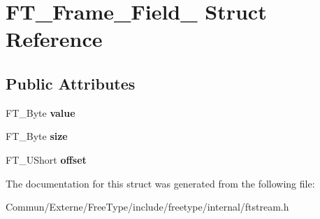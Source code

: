 \hypertarget{struct_f_t___frame___field__}{}\section{F\+T\+\_\+\+Frame\+\_\+\+Field\+\_\+ Struct Reference}
\label{struct_f_t___frame___field__}
\subsection*{Public Attributes}
\begin{DoxyCompactItemize}
\item 
F\+T\+\_\+\+Byte {\bfseries value}\hypertarget{struct_f_t___frame___field___a10f91dcdd0a582727b67ad45d42bab41}{}\label{struct_f_t___frame___field___a10f91dcdd0a582727b67ad45d42bab41}

\item 
F\+T\+\_\+\+Byte {\bfseries size}\hypertarget{struct_f_t___frame___field___a47e6fbcb90c079421d9d9b64f63a587e}{}\label{struct_f_t___frame___field___a47e6fbcb90c079421d9d9b64f63a587e}

\item 
F\+T\+\_\+\+U\+Short {\bfseries offset}\hypertarget{struct_f_t___frame___field___a85c3275fbb7044f7d6880020b6f0f794}{}\label{struct_f_t___frame___field___a85c3275fbb7044f7d6880020b6f0f794}

\end{DoxyCompactItemize}


The documentation for this struct was generated from the following file\+:\begin{DoxyCompactItemize}
\item 
Commun/\+Externe/\+Free\+Type/include/freetype/internal/ftstream.\+h\end{DoxyCompactItemize}
